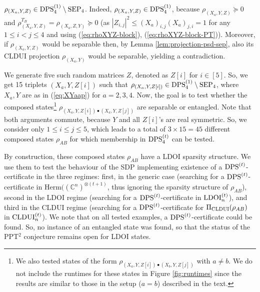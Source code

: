 \documentclass[11pt]{article}
\newcommand{\C}{\ensuremath{\mathbb{C}}} %
\newcommand{\Herm}{\mathrm{Herm}}
\newcommand{\SEP}{\text{\rm SEP}}
\newcommand{\CLDUI}{\text{\rm CLDUI}}
\newcommand{\LDOI}{\text{\rm LDOI}}
\newcommand{\DPS}{\text{\rm DPS}}
\newcommand{\ot}{\otimes}
\theoremstyle{plain}
\begin{document}
$\rho_{(X_{a},Y,Z)}\in\DPS^{(1)}_4\setminus\SEP_4$. Indeed, 
$\rho_{(X_{a},Y,Z)}\in \DPS^{(1)}_4$, because $\rho_{(X_{a},Y,Z)}\succeq 0$ and $\rho_{(X_{a},Y,Z)}^{T_B}=\rho_{(X_{a},Z,Y)} \succeq 0$ (as $|Z_{i,j}|^2\leq (X_{a})_{i,j}(X_{a})_{j,i}=1$ for any $1\le i<j\le 4$ and using  (\ref{eq:rhoXYZ-block}), (\ref{eq:rhoXYZ-block-PT})). Moreover, if $\rho_{(X_{a},Y,Z)}$ would be separable then,  by Lemma \ref{lem:projection-psd-sep}, also its CLDUI projection $\rho_{(X_{a},Y)}$ would be separable, yielding a contradiction.%

We generate   five such random matrices $Z$, denoted as $Z[i]$ for $i\in [5]$. So, we get 15  triplets $(X_a,Y,Z[i])$ such that $\rho_{(X_a,Y,Z[i])}\in\DPS^{(1)}_4\setminus \SEP_4$, where  $X_a,Y$ are as in (\ref{eq:XYaap}) for  $a=2,3,4$. Now, the goal is to test whether the composed states\footnote{We also tested states of the form $\rho_{(X_a,Y,Z[i])\bullet(X_b,Y,Z[j])} $ with $a\ne b$. We do not include the runtimes for these states in Figure \ref{fig:runtimes} since the results are %
similar to those in the setup ($a=b$) described in the text.}
$\rho_{(X_a,Y,Z[i])\bullet(X_a,Y,Z[j])} $ are separable or entangled.
Note that both arguments commute,
because %
$Y $ and all $Z[i]$'s are real symmetric. %
So, we consider only $1\le i\le j \le 5$, which leads to a total of $3\times 15=45$ 
different composed states $\rho_{AB}$ for which membership in $\DPS^{(t)}_4$ can be tested. 

By construction, these composed states $\rho_{AB}$ have a LDOI sparsity structure. We use them to test the behaviour of the SDP implementing existence of a $\DPS^{(t)}$-certificate in the three regimes: first, in the generic case (searching for a $\DPS^{(t)}$-certificate in $\Herm((\C^n)^{\ot (t+1)}$, thus ignoring the sparsity structure of $\rho_{AB}$), second in the LDOI regime (searching for a $\DPS^{(t)}$-certificate in $\LDOI_n^{(t)}$), and third in the CLDUI regime (searching for a $\DPS^{(t)}$-certificate for $\Pi_{\CLDUI}(\rho_{AB})$ in $\CLDUI_n^{(t)}$). 
We note that on all tested examples, a $\DPS^{(t)}$-certificate could be found. So, no instance of an entangled state was found, so that the status of the PPT$^2$ conjecture remains open for LDOI states.
\end{document}
